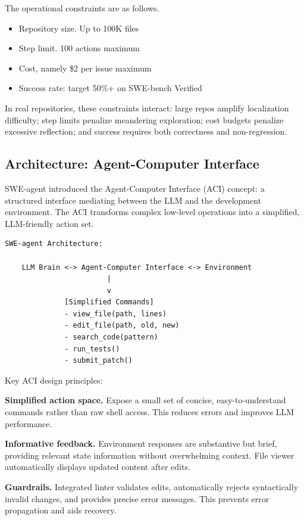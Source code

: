 The operational constraints are as follows.
\begin{itemize}
\item Repository size. Up to 100K files
\item Step limit. 100 actions maximum
\item Cost, namely \$2 per issue maximum
\item Success rate: target 50\%+ on SWE-bench Verified
\end{itemize}

In real repositories, these constraints interact: large repos amplify localization difficulty; step limits penalize meandering exploration; cost budgets penalize excessive reflection; and success requires both correctness and non-regression.

\subsection{Architecture: Agent-Computer Interface}

SWE-agent \cite{sweagent2024} introduced the Agent-Computer Interface (ACI) concept: a structured interface mediating between the LLM and the development environment. The ACI transforms complex low-level operations into a simplified, LLM-friendly action set.

\begin{verbatim}
SWE-agent Architecture:
    
    LLM Brain <-> Agent-Computer Interface <-> Environment
                        |
                        v
              [Simplified Commands]
              - view_file(path, lines)
              - edit_file(path, old, new)
              - search_code(pattern)
              - run_tests()
              - submit_patch()
\end{verbatim}

Key ACI design principles:

\textbf{Simplified action space.} Expose a small set of concise, easy-to-understand commands rather than raw shell access. This reduces errors and improves LLM performance.

\textbf{Informative feedback.} Environment responses are substantive but brief, providing relevant state information without overwhelming context. File viewer automatically displays updated content after edits.

\textbf{Guardrails.} Integrated linter validates edits, automatically rejects syntactically invalid changes, and provides precise error messages. This prevents error propagation and aids recovery.

